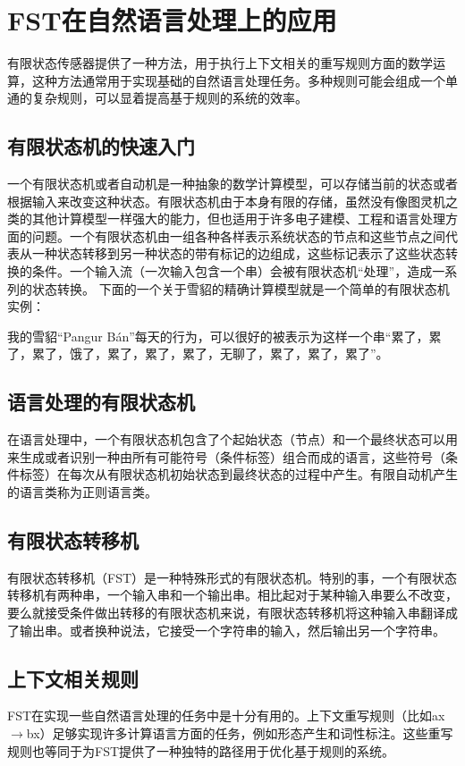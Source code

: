 
\chapter{FST在自然语言处理上的应用}
有限状态传感器提供了一种方法，用于执行上下文相关的重写规则方面的数学运算，这种方法通常用于实现基础的自然语言处理任务。多种规则可能会组成一个单通的复杂规则，可以显着提高基于规则的系统的效率。
\section{有限状态机的快速入门}
一个有限状态机或者自动机是一种抽象的数学计算模型，可以存储当前的状态或者根据输入来改变这种状态。有限状态机由于本身有限的存储，虽然没有像图灵机之类的其他计算模型一样强大的能力，但也适用于许多电子建模、工程和语言处理方面的问题。一个有限状态机由一组各种各样表示系统状态的节点和这些节点之间代表从一种状态转移到另一种状态的带有标记的边组成，这些标记表示了这些状态转换的条件。一个输入流（一次输入包含一个串）会被有限状态机“处理”，造成一系列的状态转换。 下面的一个关于雪貂的精确计算模型就是一个简单的有限状态机实例： 


我的雪貂“Pangur Bán”每天的行为，可以很好的被表示为这样一个串“累了，累了，累了，饿了，累了，累了，累了，无聊了，累了，累了，累了”。

\section{语言处理的有限状态机}
在语言处理中，一个有限状态机包含了个起始状态（节点）和一个最终状态可以用来生成或者识别一种由所有可能符号（条件标签）组合而成的语言，这些符号（条件标签）在每次从有限状态机初始状态到最终状态的过程中产生。有限自动机产生的语言类称为正则语言类。

\section{有限状态转移机}
有限状态转移机（FST）是一种特殊形式的有限状态机。特别的事，一个有限状态转移机有两种串，一个输入串和一个输出串。相比起对于某种输入串要么不改变，要么就接受条件做出转移的有限状态机来说，有限状态转移机将这种输入串翻译成了输出串。或者换种说法，它接受一个字符串的输入，然后输出另一个字符串。
\section{上下文相关规则}
FST在实现一些自然语言处理的任务中是十分有用的。上下文重写规则（比如ax$\rightarrow$bx）足够实现许多计算语言方面的任务，例如形态产生和词性标注。这些重写规则也等同于为FST提供了一种独特的路径用于优化基于规则的系统。


